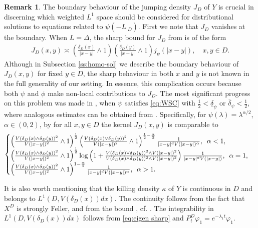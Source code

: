 \documentclass[12pt,a4paper,onecolumn]{article}
\theoremstyle{definition}
\newtheorem{rem}[thm]{Remark}
\newcommand{\1}{\mathbf 1}
\newcommand{\de}{\delta_D}
\newcommand{\ud}[1]{\underline{\delta}_{#1}}
\newcommand{\od}[1]{\overline{\delta}_{#1}}
\newcommand{\LLL}{L^1(D,V(\de(x))dx)}
\newcommand{\Lo}{\psi(-L_{|D})}
\numberwithin{equation}{section}
\begin{document}
	\begin{rem}\label{r:Lo pointwise}
    The boundary behaviour of the jumping density $J_D$ of $Y$ is crucial in discerning which weighted $L^1$ space should be considered for distributional solutions to equations related to $\Lo$. First we note that $J_D$ vanishes at the boundary. When $L=\Delta$, the sharp bound for $J_D$ from \cite{ksv_minimal2016,Bio23cpaa} is of the form
    \begin{align*}
        J_D(x,y)\asymp \left(\frac{\de(x)}{|x-y|}\wedge 1\right)\left(\frac{\de(y )}{|x-y|}\wedge 1\right) j_\psi(|x-y|),\quad x,y\in D.
    \end{align*}
     Although in Subsection \ref{ss:homo-sol} we describe the boundary behaviour of $J_D(x,y)$ for fixed $y\in D$, the sharp behaviour in both $x$ and $y$ is not known in the full generality of our setting. In essence, this complication occurs because both $\psi$ and $\phi$ make non-local contributions to $J_D$. The most significant progress on this problem was made in \cite{ksv2020boundary}, when $\psi$ satisfies \eqref{eq:WSC} with
	$\frac12<\ud{\psi}$ or $\od{\psi}<\frac12$, where analogous estimates can be obtained from \cite[Theorem 8.4]{ksv2020boundary}. Specifically, for $\psi(\lambda)=\lambda^{\alpha/2}$, $\alpha\in(0,2)$, by \cite[Example 8.5]{ksv2020boundary} for all $x,y\in D$ the kernel $J_D(x,y)$ is comparable to 
    \begin{align*}
        \begin{cases}
            \left(\frac{V(\de(x)\wedge \de(y))^2}{V(|x-y|)^2}\wedge
            1\right)^\frac12\left(\frac{V(\de(x)\vee \de(y))^2}{V(|x-y|)^2}\wedge
            1\right)^{\frac12-\frac{\alpha}2}\frac{1}{|x-y|^{d}
                V(|x-y|)^{\alpha}},\enskip\alpha<1,\\
            \left(\frac{V(\de(x)\wedge \de(y))^2}{V(|x-y|)^2}\wedge
            1\right)^\frac12\log\left(1+\frac{V(\de(x)\vee \de(y))^{2}\wedge
                V(|x-y|)^2}{V(\de(x)\wedge \de(y))^{2}\wedge
                V(|x-y|)^2}\right)\frac{1}{|x-y|^{d}
                V(|x-y|)},\enskip\alpha=1,\\
            \left(\frac{V(\de(x)\wedge \de(y))^2}{V(|x-y|)^2}\wedge
            1\right)^{1-\frac{\alpha}2}\frac{1}{|x-y|^{d} V(|x-y|)^{\alpha}},\enskip\alpha>1.
        \end{cases}
    \end{align*}
 
    
    It is also worth mentioning that the killing density $\kappa$ of $Y$ is continuous in $D$ and belongs to $\LLL$. The continuity follows from the fact that $X^D$ is strongly Feller, and from the bound \cite[Corollary 2.8]{barriers_BGR}, cf. \cite[Remark 2.5]{Bio23cpaa}. The integrability in $\LLL$ follows from \eqref{eq:eigen sharp} and $P^D_t\varphi_1=e^{-\lambda_1 t}\varphi_1$.
\end{rem}
\end{document}
